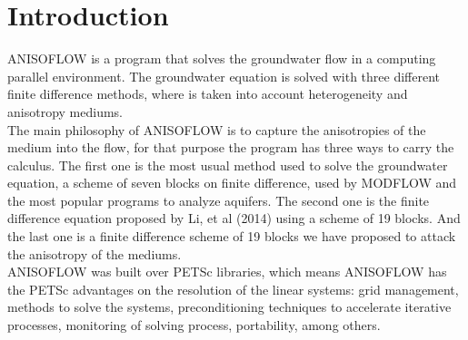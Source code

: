 \chapter{Introduction}

ANISOFLOW is a program that solves the groundwater flow in a computing parallel environment. The groundwater equation is solved with three different finite difference methods, where is taken into account heterogeneity and anisotropy  mediums.\\

The main philosophy of ANISOFLOW is to capture the anisotropies of the medium into the flow, for that purpose the program has three ways to carry the calculus. The first one is the most usual method used to solve the groundwater equation, a scheme of seven blocks on finite difference, used by MODFLOW and the most popular programs to analyze aquifers. The second one is the finite difference equation proposed by Li, et al (2014) using a scheme of 19 blocks. And the last one is a finite difference scheme of 19 blocks we have proposed to attack the anisotropy of the mediums. \\

ANISOFLOW was built over PETSc libraries, which means ANISOFLOW has the PETSc advantages on the resolution of the linear systems: grid management, methods to solve the systems, preconditioning techniques to accelerate iterative processes, monitoring of solving process, portability, among others.\\

